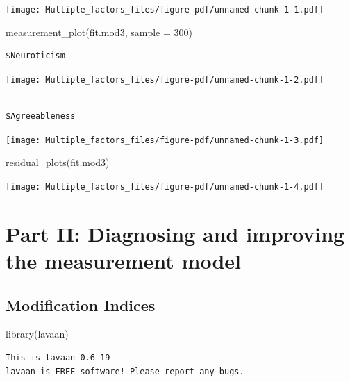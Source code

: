 \documentclass[
  letterpaper,
  DIV=11,
  numbers=noendperiod]{scrreprt}
\newenvironment{Shaded}{\begin{snugshade}}{\end{snugshade}}
\newcommand{\AttributeTok}[1]{\textcolor[rgb]{0.40,0.45,0.13}{#1}}
\newcommand{\DecValTok}[1]{\textcolor[rgb]{0.68,0.00,0.00}{#1}}
\newcommand{\FunctionTok}[1]{\textcolor[rgb]{0.28,0.35,0.67}{#1}}
\newcommand{\NormalTok}[1]{\textcolor[rgb]{0.00,0.23,0.31}{#1}}
\begin{document}
\texttt{[image: Multiple\_factors\_files/figure-pdf/unnamed-chunk-1-1.pdf]}

\begin{Shaded}
\begin{Highlighting}[]
\FunctionTok{measurement\_plot}\NormalTok{(fit.mod3, }
                 \AttributeTok{sample =} \DecValTok{300}\NormalTok{)}
\end{Highlighting}
\end{Shaded}

\begin{verbatim}
$Neuroticism
\end{verbatim}

\texttt{[image: Multiple\_factors\_files/figure-pdf/unnamed-chunk-1-2.pdf]}

\begin{verbatim}

$Agreeableness
\end{verbatim}

\texttt{[image: Multiple\_factors\_files/figure-pdf/unnamed-chunk-1-3.pdf]}

\begin{Shaded}
\begin{Highlighting}[]
\FunctionTok{residual\_plots}\NormalTok{(fit.mod3)}
\end{Highlighting}
\end{Shaded}

\texttt{[image: Multiple\_factors\_files/figure-pdf/unnamed-chunk-1-4.pdf]}

\part{Part II: Diagnosing and improving the measurement model}


\chapter{Modification Indices}\label{modification-indices}

\begin{Shaded}
\begin{Highlighting}[]
\FunctionTok{library}\NormalTok{(lavaan)}
\end{Highlighting}
\end{Shaded}

\begin{verbatim}
This is lavaan 0.6-19
lavaan is FREE software! Please report any bugs.
\end{verbatim}
\end{document}
